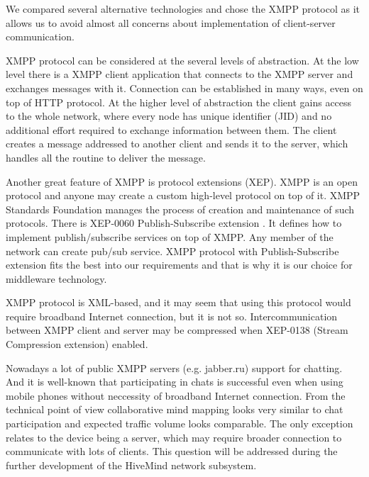 
We compared several alternative technologies and chose the XMPP protocol as it
allows us to avoid almost all concerns about implementation of client-server
communication.

XMPP protocol can be considered at the several levels of abstraction. At the low
level there is a XMPP client application that connects to the XMPP server and
exchanges messages with it. Connection can be established in many ways, even on
top of HTTP protocol. At the higher level of abstraction the client gains access
to the whole network, where every node has unique identifier (JID) and no
additional effort required to exchange information between them. The client
creates a message addressed to another client and sends it to the server, which
handles all the routine to deliver the message.

Another great feature of XMPP is protocol extensions (XEP). 
XMPP is an open protocol and anyone may create a custom high-level protocol on
top of it. XMPP Standards Foundation manages the process of creation and
maintenance of such protocols. There is XEP-0060 Publish-Subscribe extension
\cite{xep-0060}. It defines how to implement publish/subscribe services on top
of XMPP. Any member of the network can create pub/sub service. XMPP protocol
with Publish-Subscribe extension fits the best into our requirements and that is
why it is our choice for middleware technology.

XMPP protocol is XML-based, and it may seem that using this protocol would
require broadband Internet connection, but it is not so. Intercommunication
between XMPP client and server may be compressed when XEP-0138 (Stream
Compression extension) enabled.

Nowadays a lot of public XMPP servers (e.g. jabber.ru) support for chatting. And
it is well-known that participating in chats is successful even when using
mobile phones without neccessity of broadband Internet connection. From the
technical point of view collaborative mind mapping looks very similar to chat
participation and expected traffic volume looks comparable. The only exception
relates to the device being a server, which may require broader connection to
communicate with lots of clients. This question will be addressed during the
further development of the HiveMind network subsystem.

